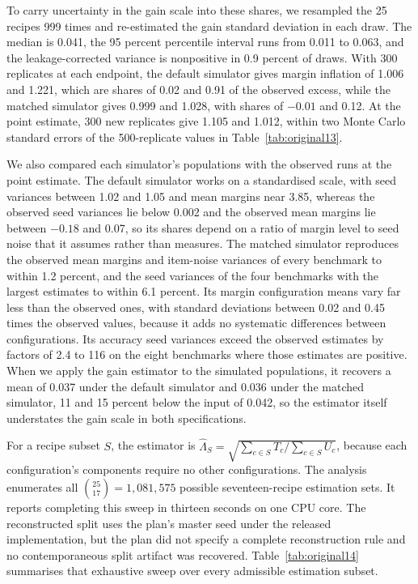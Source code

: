 To carry uncertainty in the gain scale into these shares, we resampled the 25 recipes 999 times and re-estimated the gain standard deviation in each draw. The median is 0.041, the 95 percent percentile interval runs from 0.011 to 0.063, and the leakage-corrected variance is nonpositive in 0.9 percent of draws. With 300 replicates at each endpoint, the default simulator gives margin inflation of 1.006 and 1.221, which are shares of 0.02 and 0.91 of the observed excess, while the matched simulator gives 0.999 and 1.028, with shares of $-0.01$ and 0.12. At the point estimate, 300 new replicates give 1.105 and 1.012, within two Monte Carlo standard errors of the 500-replicate values in Table~\ref{tab:original13}.

We also compared each simulator's populations with the observed runs at the point estimate. The default simulator works on a standardised scale, with seed variances between 1.02 and 1.05 and mean margins near 3.85, whereas the observed seed variances lie below 0.002 and the observed mean margins lie between $-0.18$ and 0.07, so its shares depend on a ratio of margin level to seed noise that it assumes rather than measures. The matched simulator reproduces the observed mean margins and item-noise variances of every benchmark to within 1.2 percent, and the seed variances of the four benchmarks with the largest estimates to within 6.1 percent. Its margin configuration means vary far less than the observed ones, with standard deviations between 0.02 and 0.45 times the observed values, because it adds no systematic differences between configurations. Its accuracy seed variances exceed the observed estimates by factors of 2.4 to 116 on the eight benchmarks where those estimates are positive. When we apply the gain estimator to the simulated populations, it recovers a mean of 0.037 under the default simulator and 0.036 under the matched simulator, 11 and 15 percent below the input of 0.042, so the estimator itself understates the gain scale in both specifications.

For a recipe subset $S$, the estimator is $\widehat\Lambda_S=\sqrt{\sum_{c\in S}T_c/\sum_{c\in S}U_c}$, because each configuration's components require no other configurations. The analysis enumerates all $\binom{25}{17}=1{,}081{,}575$ possible seventeen-recipe estimation sets. It reports completing this sweep in thirteen seconds on one CPU core. The reconstructed split uses the plan's master seed under the released implementation, but the plan did not specify a complete reconstruction rule and no contemporaneous split artifact was recovered. Table~\ref{tab:original14} summarises that exhaustive sweep over every admissible estimation subset.

